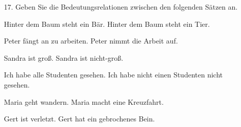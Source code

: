 
\begin{frame}

\begin{itemize}
	\item[17.] Geben Sie die Bedeutungsrelationen zwischen den folgenden Sätzen an.
		
		\settowidth {}
		
		\eal 
		\ex Hinter dem Baum steht ein Bär. 
		\ex Hinter dem Baum steht ein Tier. 
		\zl
		
		\eal 
		\ex Peter fängt an zu arbeiten. 
		\ex Peter nimmt die Arbeit auf.
		\zl
		
		\eal 
		\ex Sandra ist groß. 
		\ex Sandra ist nicht-groß.
		\zl
		
		\eal 
		\ex Ich habe alle Studenten gesehen. 
		\ex Ich habe nicht einen Studenten nicht gesehen.
		\zl
		
		\eal 
		\ex Maria geht wandern. 
		\ex Maria macht eine Kreuzfahrt.
		\zl
		
		\eal 
		\ex Gert ist verletzt. 
		\ex Gert hat ein gebrochenes Bein. 
		\zl
		
\end{itemize}
	
\end{frame}


